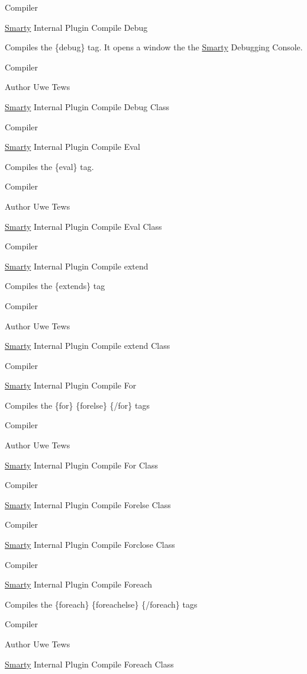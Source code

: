 Compiler

\hyperlink{class_smarty}{Smarty} Internal Plugin Compile Debug

Compiles the \{debug\} tag. It opens a window the the \hyperlink{class_smarty}{Smarty} Debugging Console.

Compiler \begin{DoxyAuthor}{Author}
Uwe Tews
\end{DoxyAuthor}
\hyperlink{class_smarty}{Smarty} Internal Plugin Compile Debug Class

Compiler

\hyperlink{class_smarty}{Smarty} Internal Plugin Compile Eval

Compiles the \{eval\} tag.

Compiler \begin{DoxyAuthor}{Author}
Uwe Tews
\end{DoxyAuthor}
\hyperlink{class_smarty}{Smarty} Internal Plugin Compile Eval Class

Compiler

\hyperlink{class_smarty}{Smarty} Internal Plugin Compile extend

Compiles the \{extends\} tag

Compiler \begin{DoxyAuthor}{Author}
Uwe Tews
\end{DoxyAuthor}
\hyperlink{class_smarty}{Smarty} Internal Plugin Compile extend Class

Compiler

\hyperlink{class_smarty}{Smarty} Internal Plugin Compile For

Compiles the \{for\} \{forelse\} \{/for\} tags

Compiler \begin{DoxyAuthor}{Author}
Uwe Tews
\end{DoxyAuthor}
\hyperlink{class_smarty}{Smarty} Internal Plugin Compile For Class

Compiler

\hyperlink{class_smarty}{Smarty} Internal Plugin Compile Forelse Class

Compiler

\hyperlink{class_smarty}{Smarty} Internal Plugin Compile Forclose Class

Compiler

\hyperlink{class_smarty}{Smarty} Internal Plugin Compile Foreach

Compiles the \{foreach\} \{foreachelse\} \{/foreach\} tags

Compiler \begin{DoxyAuthor}{Author}
Uwe Tews
\end{DoxyAuthor}
\hyperlink{class_smarty}{Smarty} Internal Plugin Compile Foreach Class

